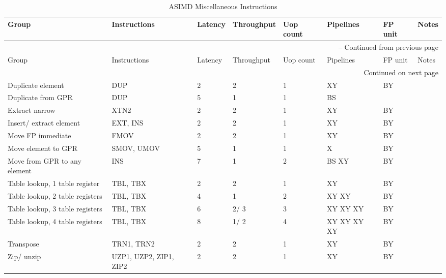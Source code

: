 \newpage
\begin{longtable}{|p{1in}|p{1in}|l|l|l|p{1in}|l|p{1in}|}
\caption{ASIMD Miscellaneous Instructions} \\
\hline
Group & Instructions & Latency & Throughput & Uop count & Pipelines & FP unit & Notes\\
\hline
\endfirsthead
\hline
\multicolumn{8}{|r|}{{\tablename\ \thetable{} -- Continued from previous page}} \\
\hline
Group & Instructions & Latency & Throughput & Uop count & Pipelines & FP unit & Notes\\
\hline
\endhead
\hline
\multicolumn{8}{|r|}{{Continued on next page}} \\
\hline
\endfoot
\hline
\endlastfoot
Duplicate element & DUP & 2 & 2 & 1 & XY & BY & \\
\hline
Duplicate from GPR & DUP & 5 & 1 & 1 & BS &  & \\
\hline
Extract narrow & XTN{{2}} & 2 & 2 & 1 & XY & BY & \\
\hline
Insert/ extract element & EXT, INS & 2 & 2 & 1 & XY & BY & \\
\hline
Move FP immediate & FMOV & 2 & 2 & 1 & XY & BY & \\
\hline
Move element to GPR & SMOV, UMOV & 5 & 1 & 1 & X & BY & \\
\hline
Move from GPR to any element & INS & 7 & 1 & 2 & BS XY & BY & \\
\hline
Table lookup, 1 table register & TBL, TBX & 2 & 2 & 1 & XY & BY & \\
\hline
Table lookup, 2 table registers & TBL, TBX & 4 & 1 & 2 & XY XY & BY & \\
\hline
Table lookup, 3 table registers & TBL, TBX & 6 & 2/ 3 & 3 & XY XY XY & BY & \\
\hline
Table lookup, 4 table registers & TBL, TBX & 8 & 1/ 2 & 4 & XY XY XY XY & BY & \\
\hline
Transpose & TRN1, TRN2 & 2 & 2 & 1 & XY & BY & \\
\hline
Zip/ unzip & UZP1, UZP2, ZIP1, ZIP2 & 2 & 2 & 1 & XY & BY & \\
\hline
\end{longtable}
\newpage
